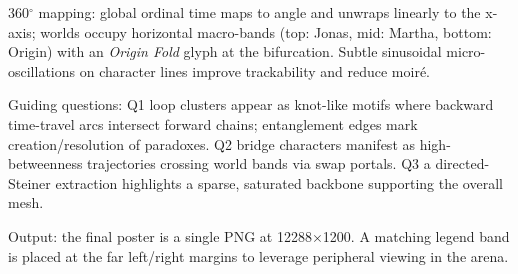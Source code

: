 \documentclass[a4paper,UKenglish,cleveref, autoref, thm-restate]{lipics-v2021}
\begin{document}
360$^\circ$ mapping: global ordinal time maps to angle and unwraps linearly to the x-axis; worlds occupy horizontal macro-bands (top: Jonas, mid: Martha, bottom: Origin) with an \emph{Origin Fold} glyph at the bifurcation. Subtle sinusoidal micro-oscillations on character lines improve trackability and reduce moiré.

Guiding questions: Q1 loop clusters appear as knot-like motifs where backward time-travel arcs intersect forward chains; entanglement edges mark creation/resolution of paradoxes. Q2 bridge characters manifest as high-betweenness trajectories crossing world bands via swap portals. Q3 a directed-Steiner extraction highlights a sparse, saturated backbone supporting the overall mesh.

Output: the final poster is a single PNG at 12288$\times$1200. A matching legend band is placed at the far left/right margins to leverage peripheral viewing in the arena.




\end{document}
